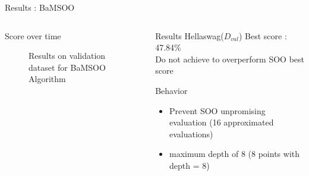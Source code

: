 \begin{frame}{Results : BaMSOO} 
    
    \begin{columns}
    
        \begin{column}{0.6\textwidth}
            \begin{block}{Score over time}
                \begin{figure}
                    \centering
                    
                    \caption{Results on validation dataset for BaMSOO Algorithm}
                \end{figure}
            
            \end{block}   
        \end{column}

        \begin{column}{0.4\textwidth}
            \begin{block}{Results}
                Hellaswag($D_{val}$) Best score : 47.84\% \\
                Do not achieve to overperform SOO best score   
            \end{block}

            \begin{block}{Behavior}

                \begin{itemize}
                    \item Prevent SOO unpromising evaluation (16 approximated evaluations)
                    \item maximum depth of 8 (8 points with depth = 8)
                \end{itemize}

            \end{block}
             
        \end{column}
    \end{columns}    
\end{frame}



